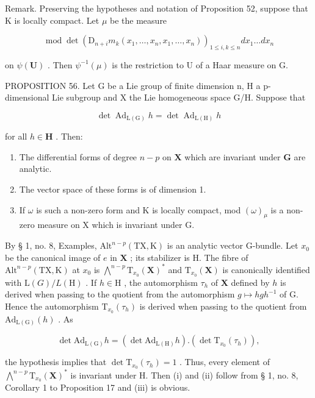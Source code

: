 Remark. Preserving the hypotheses and notation of Proposition 52, suppose that K is locally compact. Let \(\mu\) be the measure

\[
\operatorname{mod} \det (\mathrm{D} _ {n + i} m _ {k} (x _ {1}, \dots , x _ {n}, x _ {1}, \dots , x _ {n})) _ {1 \leqslant i, k \leqslant n} d x _ {1} \dots d x _ {n}
\]

on \(\psi (\mathbf{U})\) . Then \(\psi^{-1}(\mu)\) is the restriction to U of a Haar measure on G.

PROPOSITION 56. Let G be a Lie group of finite dimension n, H a p-dimensional Lie subgroup and X the Lie homogeneous space G/H. Suppose that

\[
\det \operatorname{Ad} _ {\mathrm{L} (\mathrm{G})} h = \det \operatorname{Ad} _ {\mathrm{L} (\mathrm{H})} h
\]

for all \(h\in \mathbf{H}\) . Then:

\begin{enumerate}
\def\labelenumi{(\roman{enumi})}
\item
  The differential forms of degree \(n - p\) on \(\mathbf{X}\) which are invariant under \(\mathbf{G}\) are analytic.
\item
  The vector space of these forms is of dimension 1.
\item
  If \(\omega\) is such a non-zero form and K is locally compact, mod \((\omega)_{\mu}\) is a non-zero measure on X which is invariant under G.
\end{enumerate}

By § 1, no. 8, Examples, \(\mathrm{Alt}^{n - p}(\mathrm{TX},\mathrm{K})\) is an analytic vector G-bundle. Let \(x_0\) be the canonical image of \(e\) in \(\mathbf{X}\) ; its stabilizer is H. The fibre of \(\mathrm{Alt}^{n - p}(\mathrm{TX},\mathrm{K})\) at \(x_0\) is \(\bigwedge^{n - p}\mathrm{T}_{x_0}(\mathbf{X})^*\) and \(\mathrm{T}_{x_0}(\mathbf{X})\) is canonically identified with \(\mathrm{L}(G) / L(\mathrm{H})\) . If \(h\in \mathrm{H}\) , the automorphism \(\tau_h\) of \(\mathbf{X}\) defined by \(h\) is derived when passing to the quotient from the automorphism \(g\mapsto hgh^{-1}\) of G. Hence the automorphism \(\mathrm{T}_{x_0}(\tau_h)\) is derived when passing to the quotient from \(\mathrm{Ad}_{\mathrm{L(G)}}(h)\) . As

\[
\det \mathrm{Ad} _ {\mathrm{L(G)}} h = (\det \mathrm{Ad} _ {\mathrm{L(H)}} h). (\det \mathrm{T} _ {x _ {0}} (\tau_ {h})),
\]

the hypothesis implies that \(\det \mathrm{T}_{x_0}(\tau_h) = 1\) . Thus, every element of \(\bigwedge^{n - p}\mathrm{T}_{x_0}(\mathbf{X})^*\) is invariant under H. Then (i) and (ii) follow from § 1, no. 8, Corollary 1 to Proposition 17 and (iii) is obvious.

